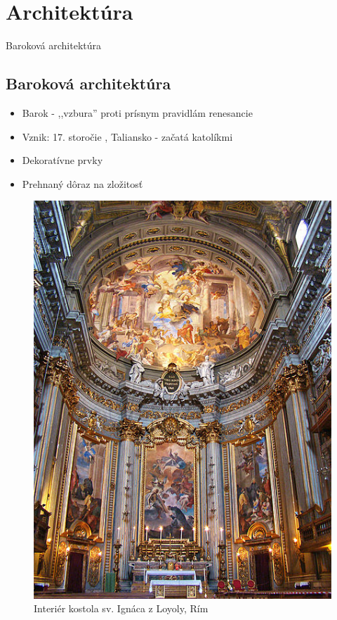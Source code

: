\documentclass[dvipsnames]{beamer}
\begin{document}
\section{Architektúra}
\frame{\sectionpage}
\begin{frame}{Baroková architektúra}
	\subsection{Baroková architektúra}
	\begin{itemize}
		\item Barok - ,,vzbura'' proti prísnym pravidlám renesancie
		\item Vznik: 17. storočie , Taliansko - začatá katolíkmi
		\item Dekoratívne prvky
		\item Prehnaný dôraz na zložitosť
	\end{itemize}
	\begin{figure}
		\includegraphics[scale=0.3]{loyola}
		\caption{Interiér kostola sv. Ignáca z Loyoly, Rím}
	\end{figure}
\end{frame}
\end{document}
